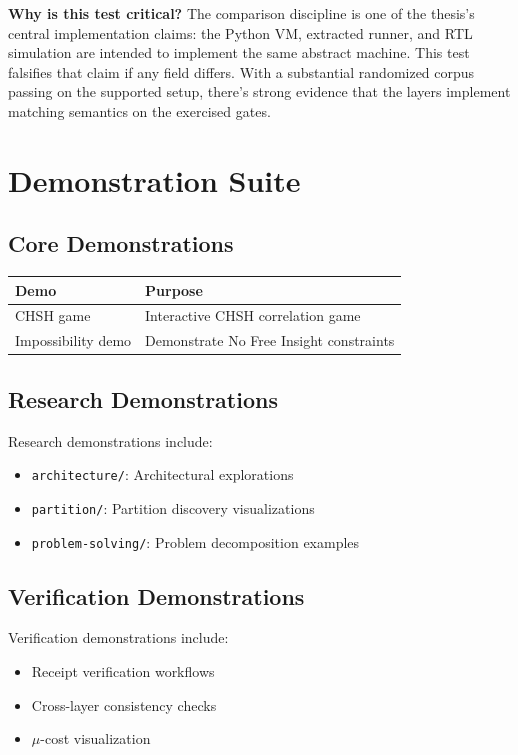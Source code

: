\textbf{Why is this test critical?} The comparison discipline is one of the thesis's central implementation claims: the Python VM, extracted runner, and RTL simulation are intended to implement the same abstract machine. This test falsifies that claim if any field differs. With a substantial randomized corpus passing on the supported setup, there's strong evidence that the layers implement matching semantics on the exercised gates.


\section{Demonstration Suite}

\subsection{Core Demonstrations}

\begin{center}
\begin{tabular}{|l|l|}
\hline
\textbf{Demo} & \textbf{Purpose} \\
\hline
CHSH game & Interactive CHSH correlation game \\
Impossibility demo & Demonstrate No Free Insight constraints \\
\hline
\end{tabular}
\end{center}

\subsection{Research Demonstrations}

Research demonstrations include:
\begin{itemize}
    \item \texttt{architecture/}: Architectural explorations
    \item \texttt{partition/}: Partition discovery visualizations
    \item \texttt{problem-solving/}: Problem decomposition examples
\end{itemize}

\subsection{Verification Demonstrations}

Verification demonstrations include:
\begin{itemize}
    \item Receipt verification workflows
    \item Cross-layer consistency checks
    \item $\mu$-cost visualization
\end{itemize}

